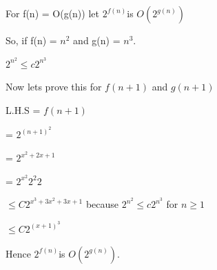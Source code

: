 \documentclass[letterpaper,portrait,12pt]{article}
\begin{document}
\begin{flushleft}
For f(n) = O(g(n)) let $2^{f(n)}$is $O(2^{g(n)})$
\end{flushleft}


\begin{flushleft}
So, if f(n) = $n^2$ and g(n) = $n^3$.
\end{flushleft}


\begin{flushleft}

\end{flushleft}


\begin{flushleft}
$2^{n^2} \le c  2^{n^3}$ 
\end{flushleft}


\begin{flushleft}

\end{flushleft}


\begin{flushleft}
Now lets prove this for $f(n+1)$ and $g(n+1)$
\end{flushleft}


\begin{flushleft}

\end{flushleft}


\begin{flushleft}
L.H.S  = $f(n+1)$
\end{flushleft}


\begin{flushleft}
	= $2^{(n+1)^2}$
\end{flushleft}


\begin{flushleft}
	= $2^{x^2+2x+1}$
\end{flushleft}


\begin{flushleft}
	= $2^{x^2} 2^2 2$
\end{flushleft}


\begin{flushleft}
	$\le C 2^{x^3 + 3x^2+3x +1}$ because $2^{n^2} \le c  2^{n^3}$ for $n\ge1$
\end{flushleft}


\begin{flushleft}
	$\le C 2^{(x+1)^3}$
\end{flushleft}


\begin{flushleft}
Hence  $2^{f(n)}$is $O(2^{g(n)})$. 
\end{flushleft}
\end{document}
